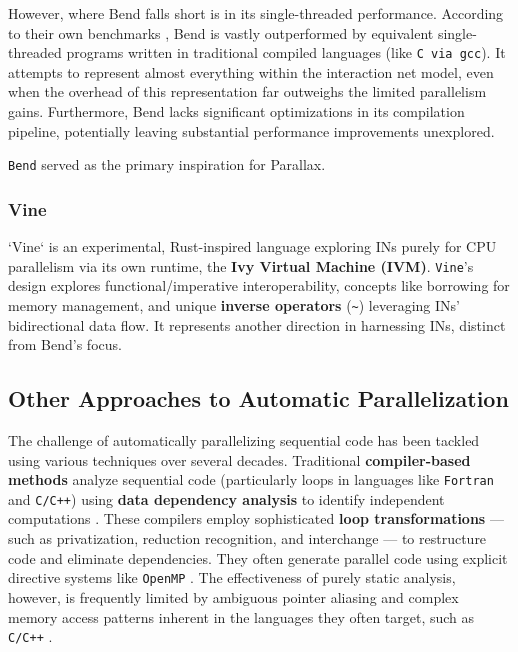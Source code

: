 However, where Bend falls short is in its single-threaded performance. According to 
their own benchmarks \cite{BendGithub}, Bend is vastly outperformed by equivalent single-threaded programs written in traditional compiled languages (like \texttt{C via gcc}). It attempts to represent almost everything within the interaction net model, even when the overhead of this representation far outweighs the limited parallelism gains. Furthermore, Bend lacks significant optimizations in its compilation pipeline, potentially leaving substantial performance improvements unexplored.

\texttt{Bend} served as the primary inspiration for Parallax.

\subsubsection{Vine}

`Vine` \cite{VineGithub} is an experimental, Rust-inspired language exploring INs purely for CPU parallelism via its own runtime, the \textbf{Ivy Virtual Machine (IVM)}. \texttt{Vine}'s design explores functional/imperative interoperability, concepts like borrowing for memory management, and unique \textbf{inverse operators} (\texttt{\textasciitilde{}}) leveraging INs' bidirectional data flow. It represents another direction in harnessing INs, distinct from Bend's focus.


\subsection{Other Approaches to Automatic Parallelization}

The challenge of automatically parallelizing sequential code has been tackled using various techniques over several decades. Traditional \textbf{compiler-based methods} analyze sequential code (particularly loops in languages like \texttt{Fortran} and \texttt{C/C++}) using \textbf{data dependency analysis} to identify independent computations \cite{KennedyAllen2001OptimizingCompilers}. These compilers employ sophisticated \textbf{loop transformations} — such as privatization, reduction recognition, and interchange — to restructure code and eliminate dependencies. They often generate parallel code using explicit directive systems like \texttt{OpenMP} \cite{OpenMPARBP2018OpenMPSpecification}. The effectiveness of purely static analysis, however, is frequently limited by ambiguous pointer aliasing and complex memory access patterns inherent in the languages they often target, such as \texttt{C/C++} \cite{Allen1983DependenceAnalysis}.

